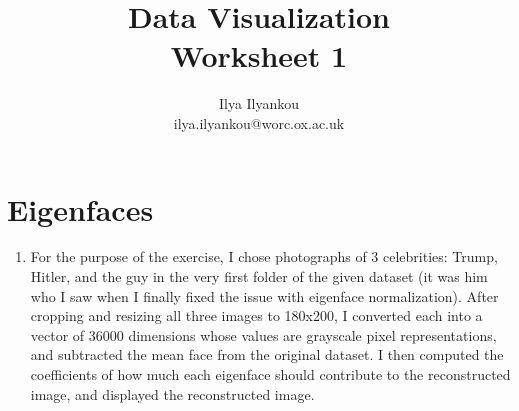 \documentclass{article}
\begin{document}
\title{Data Visualization \\ Worksheet 1}
\author{\large Ilya Ilyankou \\ ilya.ilyankou@worc.ox.ac.uk}
\date{}

\maketitle

\section{Eigenfaces}

\begin{enumerate}
\item
For the purpose of the exercise, I chose photographs of 3 celebrities: Trump, Hitler, and the guy in the very first folder of the given dataset (it was him who I saw when I finally fixed the issue with eigenface normalization). After cropping and resizing all three images to 180x200, I converted each into a vector of 36000 dimensions whose values are grayscale pixel representations, and subtracted the mean face from the original dataset. I then computed the coefficients of how much each eigenface should contribute to the reconstructed image, and displayed the reconstructed image.


\end{enumerate}
\end{document}
